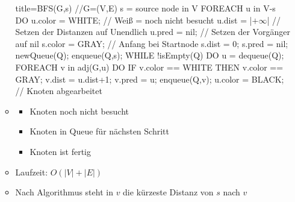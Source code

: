 \documentclass[
    12pt,
    a4paper,
    ngerman,
    color=3b,%
    marginpar=false,
    colorback=false,
    leqno,
]{tudaexercise}
\begin{document}
\begin{itemize}
\begin{itemize}
\begin{ccode}[autogobble,escapeinside=||]{title={BFS(G,s) //G=(V,E) s = source node in V}}
                        FOREACH u in V-{s} DO
                            u.color = WHITE;        // Weiß = noch nicht besucht
                            u.dist = |$+\infty$|            // Setzen der Distanzen auf Unendlich
                            u.pred = nil;           // Setzen der Vorgänger auf nil
                        s.color = GRAY;             // Anfang bei Startnode
                        s.dist = 0;
                        s.pred = nil;
                        newQueue(Q);
                        enqueue(Q,s);
                        WHILE !isEmpty(Q) DO
                            u = dequeue(Q); 
                            FOREACH v in adj(G,u) DO
                                IF v.color == WHITE THEN
                                    v.color == GRAY;
                                    v.dist = u.dist+1;
                                    v.pred = u;
                                    enqueue(Q,v);
                            u.color = BLACK;            // Knoten abgearbeitet
                    \end{ccode}
                \item[] \begin{tcolorbox}[
                    colback=yellow!20,
                    colframe=black!50!red!100,
                    enhanced,
                    title={Farben:}
                ]
                \begin{itemize}
                    \item { Knoten noch nicht besucht}
                    \item { Knoten in Queue für nächsten Schritt}
                    \item { Knoten ist fertig}
                \end{itemize}
                \end{tcolorbox}
                \item Laufzeit: $O(|V| + |E|)$
                \item Nach Algorithmus steht in $v$ die kürzeste Distanz von $s$ nach $v$
            \end{itemize}

\pagebreak


\end{itemize}
\end{document}
